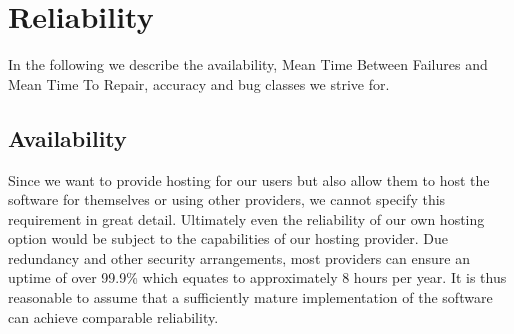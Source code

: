 \documentclass[a4paper,12pt,chapterprefix=false,bibliography=totoc,listof=totoc,]{scrreprt}
\begin{document}
\section{{\color{magenta} Reliability}}
{\color{magenta}
In the following we describe the availability, Mean Time Between Failures and Mean Time To Repair, accuracy and bug classes we strive for.
}


\subsection{{\color{magenta} Availability}}
{\color{magenta}
Since we want to provide hosting for our users but also allow them to host the software for themselves or using other providers, we cannot specify this requirement in great detail. Ultimately even the reliability of our own hosting option would be subject to the capabilities of our hosting provider. Due redundancy and other security arrangements, most providers can ensure an uptime of over 99.9\% which equates to approximately 8 hours per year. It is thus reasonable to assume that a sufficiently mature implementation of the software can achieve comparable reliability.
}
\end{document}

